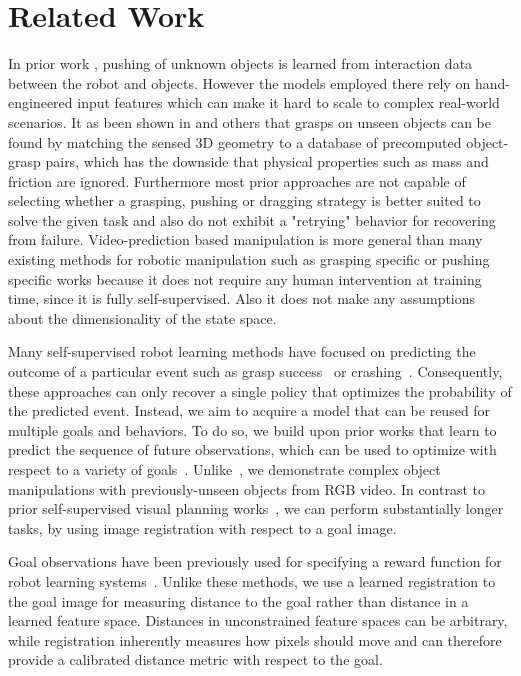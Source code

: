 \vspace{-0.1cm}
\section{Related Work}
\vspace{-0.1cm}
In prior work \cite{hermans2013learning,salganicoff1993vision}, pushing of unknown objects is learned from interaction data between the robot and objects. However the models employed there rely on hand-engineered input features which can make it hard to scale to complex real-world scenarios. 
It as been shown in \cite{goldfeder2009data} and others that grasps on unseen objects can be found by matching the sensed 3D geometry to a database of precomputed object-grasp pairs, which has the downside that physical properties such as mass and friction are ignored. Furthermore most prior approaches are not capable of selecting whether a grasping, pushing or dragging strategy is better suited to solve the given task and also do not exhibit a "retrying" behavior for recovering from failure.
Video-prediction based manipulation is more general than many existing methods for robotic manipulation such as grasping specific \cite{lenz2015deep, goldfeder2009data, zeng2017robotic} or pushing specific works \cite{hermans2013learning, salganicoff1993vision} because it does not require any human intervention at training time, since it is fully self-supervised. Also it does not make any assumptions about the dimensionality of the state space.

Many self-supervised robot learning methods have focused on predicting the outcome of a particular event such as grasp success~\cite{lerrel,google_handeye,princeton_pushgrasp} or crashing~\cite{crashing,greg_kahn_uncertainty}. Consequently, these approaches can only recover a single policy that optimizes the probability of the predicted event. Instead, we aim to acquire a model that can be reused for multiple goals and behaviors. To do so, we build upon prior works that learn to predict the sequence of future observations, which can be used to optimize with respect to a variety of goals~\cite{foresight,sna,se3_control}. Unlike~\cite{se3_control}, we demonstrate complex object manipulations with previously-unseen objects from RGB video. In contrast to prior self-supervised visual planning works~\cite{foresight,sna}, we can perform substantially longer tasks, by using image registration with respect to a goal image.

Goal observations have been previously used for specifying a reward function for robot learning systems~\cite{jagersand1995visual,deguchi1999image,e2c,dsae}. Unlike these methods, we use a learned registration to the goal image for measuring distance to the goal rather than distance in a learned feature space. Distances in unconstrained feature spaces can be arbitrary, while registration inherently measures how pixels should move and can therefore provide a calibrated distance metric with respect to the goal. 

